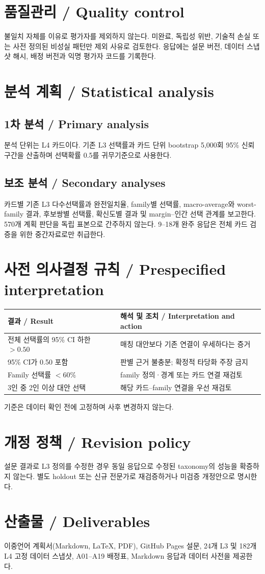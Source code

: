 \documentclass[11pt,a4paper]{article}
\newcommand{\bisection}[2]{\section{#1 / \texorpdfstring{\color{teal}}{}#2}}
\newcommand{\bisubsection}[2]{\subsection{#1 / #2}}
\begin{document}
\bisection{품질관리}{Quality control}
불일치 자체를 이유로 평가자를 제외하지 않는다. 미완료, 독립성 위반, 기술적 손실 또는 사전 정의된 비성실 패턴만 제외 사유로 검토한다. 응답에는 설문 버전, 데이터 스냅샷 해시, 배정 버전과 익명 평가자 코드를 기록한다.

\bisection{분석 계획}{Statistical analysis}
\bisubsection{1차 분석}{Primary analysis}
분석 단위는 L4 카드이다. 기존 L3 선택률과 카드 단위 bootstrap 5,000회 95\% 신뢰구간을 산출하며 선택확률 0.5를 귀무기준으로 사용한다.

\bisubsection{보조 분석}{Secondary analyses}
카드별 기존 L3 다수선택률과 완전일치율, family별 선택률, macro-average와 worst-family 결과, 후보쌍별 선택률, 확신도별 결과 및 margin--인간 선택 관계를 보고한다. 570개 계획 판단을 독립 표본으로 간주하지 않는다. 9--18개 완주 응답은 전체 카드 검증을 위한 중간자료로만 취급한다.

\bisection{사전 의사결정 규칙}{Prespecified interpretation}
\begin{longtable}{p{}p{}}
\toprule
결과 / Result & 해석 및 조치 / Interpretation and action\\
\midrule
전체 선택률의 95\% CI 하한 $>0.50$ & 매칭 대안보다 기존 연결이 우세하다는 증거\\
95\% CI가 0.50 포함 & 판별 근거 불충분; 확정적 타당화 주장 금지\\
Family 선택률 $<60\%$ & family 정의·경계 또는 카드 연결 재검토\\
3인 중 2인 이상 대안 선택 & 해당 카드--family 연결을 우선 재검토\\
\bottomrule
\end{longtable}
기준은 데이터 확인 전에 고정하며 사후 변경하지 않는다.

\bisection{개정 정책}{Revision policy}
설문 결과로 L3 정의를 수정한 경우 동일 응답으로 수정된 taxonomy의 성능을 확증하지 않는다. 별도 holdout 또는 신규 전문가로 재검증하거나 미검증 개정안으로 명시한다.

\bisection{산출물}{Deliverables}
이중언어 계획서(Markdown, LaTeX, PDF), GitHub Pages 설문, 24개 L3 및 182개 L4 고정 데이터 스냅샷, A01--A19 배정표, Markdown 응답과 데이터 사전을 제공한다.
\end{document}
